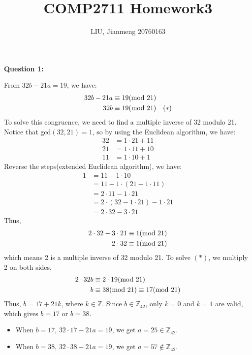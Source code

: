 \documentclass[a4paper,11pt]{article}
\title{\textbf{COMP2711} Homework3}
\author{LIU, Jianmeng 20760163}
\date{}
\begin{document}
    \maketitle

    \begin{spacing}{1.4}

    \setlength{\parindent}{0px}

    \textbf{Question 1:}

    From $32b-21a=19$, we have:
    \begin{align*}
        32b-21a&\equiv 19 (\rm mod \ 21)\\
        32b&\equiv 19 (\rm mod \ 21)\ \ \ (*)
    \end{align*}
    To solve this congruence, we need to find a multiple inverse
    of 32 modulo 21. Notice that gcd$(32, 21)=1$, so by
    using the Euclidean algorithm, we have:
    \begin{align*}
        32 &= 1\cdot 21 + 11\\
        21 &= 1\cdot 11 + 10\\
        11 &= 1\cdot 10 + 1
    \end{align*}
    Reverse the steps(extended Euclidean algorithm), we have:
    \begin{align*}
        1&=11-1\cdot 10\\
         &=11-1\cdot (21-1\cdot 11)\\
         &=2\cdot 11-1\cdot 21\\
         &=2\cdot (32-1\cdot 21)-1\cdot 21\\
         &=2\cdot 32-3\cdot 21
    \end{align*}
    Thus,
    \begin{align*}
        2\cdot 32-3\cdot 21 &\equiv 1 ({\rm mod}\ 21)\\
        2\cdot 32 &\equiv 1 ({\rm mod}\ 21)
    \end{align*}
    which means 2 is a multiple inverse of 32 modulo 21.
    To solve $(*)$, we multiply 2 on both sides,
    \begin{align*}
        2\cdot 32b &\equiv 2\cdot 19 ({\rm mod}\ 21)\\
        b &\equiv 38({\rm mod}\ 21) \equiv 17({\rm mod}\ 21)
    \end{align*}
    Thus, $b=17+21k$, where $k\in \mathbb{Z}$. 
    Since $b\in \mathbb{Z}_{42}$, only $k=0$ and $k=1$ are valid,
    which gives $b=17$ or $b=38$.
    \begin{itemize}
        \item When $b=17$, $32\cdot 17-21a=19$, 
        we get $a=25\in \mathbb{Z}_{42}$.
        \item When $b=38$, $32\cdot 38-21a=19$, 
        we get $a=57\notin \mathbb{Z}_{42}$.
    \end{itemize}


\end{spacing}
\end{document}
